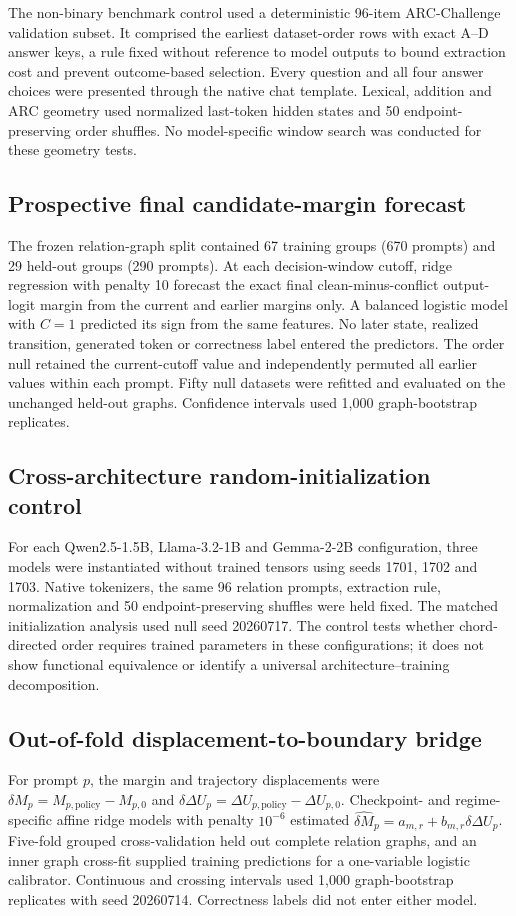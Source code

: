 \documentclass[11pt]{article}
\begin{document}
The non-binary benchmark control used a deterministic 96-item ARC-Challenge validation subset. It comprised the earliest dataset-order rows with exact A--D answer keys, a rule fixed without reference to model outputs to bound extraction cost and prevent outcome-based selection. Every question and all four answer choices were presented through the native chat template. Lexical, addition and ARC geometry used normalized last-token hidden states and 50 endpoint-preserving order shuffles. No model-specific window search was conducted for these geometry tests.

\subsection*{Prospective final candidate-margin forecast}
The frozen relation-graph split contained 67 training groups (670 prompts) and 29 held-out groups (290 prompts). At each decision-window cutoff, ridge regression with penalty 10 forecast the exact final clean-minus-conflict output-logit margin from the current and earlier margins only. A balanced logistic model with $C=1$ predicted its sign from the same features. No later state, realized transition, generated token or correctness label entered the predictors. The order null retained the current-cutoff value and independently permuted all earlier values within each prompt. Fifty null datasets were refitted and evaluated on the unchanged held-out graphs. Confidence intervals used 1,000 graph-bootstrap replicates.

\subsection*{Cross-architecture random-initialization control}
For each Qwen2.5-1.5B, Llama-3.2-1B and Gemma-2-2B configuration, three models were instantiated without trained tensors using seeds 1701, 1702 and 1703. Native tokenizers, the same 96 relation prompts, extraction rule, normalization and 50 endpoint-preserving shuffles were held fixed. The matched initialization analysis used null seed 20260717. The control tests whether chord-directed order requires trained parameters in these configurations; it does not show functional equivalence or identify a universal architecture--training decomposition.

\subsection*{Out-of-fold displacement-to-boundary bridge}
For prompt $p$, the margin and trajectory displacements were $\delta M_p=M_{p,\mathrm{policy}}-M_{p,0}$ and $\delta\Delta U_p=\Delta U_{p,\mathrm{policy}}-\Delta U_{p,0}$. Checkpoint- and regime-specific affine ridge models with penalty $10^{-6}$ estimated $\widehat{\delta M}_p=a_{m,r}+b_{m,r}\delta\Delta U_p$. Five-fold grouped cross-validation held out complete relation graphs, and an inner graph cross-fit supplied training predictions for a one-variable logistic calibrator. Continuous and crossing intervals used 1,000 graph-bootstrap replicates with seed 20260714. Correctness labels did not enter either model.
\end{document}
